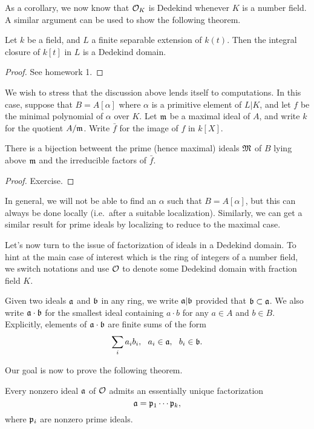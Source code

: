 As a corollary, we now know that $\mathcal{O}_{K}$ is Dedekind whenever $K$ is a number field.
A similar argument can be used to show the following theorem.
\begin{theorem}
  Let $k$ be a field, and $L$ a finite separable extension of $k(t)$.
  Then the integral closure of $k[t]$ in $L$ is a Dedekind domain.
\end{theorem}
\begin{proof}
  See homework 1.
\end{proof}

We wish to stress that the discussion above lends itself to computations.
In this case, suppose that $B = A[\alpha]$ where $\alpha$ is a primitive element of $L|K$, and let $f$ be the minimal polynomial of $\alpha$ over $K$.
Let $\mathfrak{m}$ be a maximal ideal of $A$, and write $k$ for the quotient $A/\mathfrak{m}$.
Write $\bar f$ for the image of $f$ in $k[X]$.

\begin{theorem}
  There is a bijection betweent the prime (hence maximal) ideals $\mathfrak{M}$ of $B$ lying above $\mathfrak{m}$ and the irreducible factors of $\bar f$.
\end{theorem}
\begin{proof}
  Exercise.
\end{proof}

In general, we will not be able to find an $\alpha$ such that $B = A[\alpha]$, but this can always be done locally (i.e.~after a suitable localization).
Similarly, we can get a similar result for prime ideals by localizing to reduce to the maximal case.

Let's now turn to the issue of factorization of ideals in a Dedekind domain.
To hint at the main case of interest which is the ring of integers of a number field, we switch notations and use $\mathcal{O}$ to denote some Dedekind domain with fraction field $K$.

Given two ideals $\mathfrak{a}$ and $\mathfrak{b}$ in any ring, we write $\mathfrak{a} | \mathfrak{b}$ provided that $\mathfrak{b} \subset \mathfrak{a}$.
We also write $\mathfrak{a} \cdot \mathfrak{b}$ for the smallest ideal containing $a \cdot b$ for any $a \in A$ and $b \in B$.
Explicitly, elements of $\mathfrak{a} \cdot \mathfrak{b}$ are finite sums of the form
\[ \sum_{i} a_{i} b_{i}, \ \ a_{i} \in \afrak, \ \ b_{i} \in \bfrak. \]

Our goal is now to prove the following theorem.
\begin{theorem}\label{theorem:ideal_factorization}
  Every nonzero ideal $\mathfrak{a}$ of $\mathcal{O}$ admits an essentially unique factorization
  \[ \mathfrak{a} = \mathfrak{p}_{1} \cdots \mathfrak{p}_{k}, \]
  where $\mathfrak{p}_{i}$ are nonzero prime ideals.
\end{theorem}

